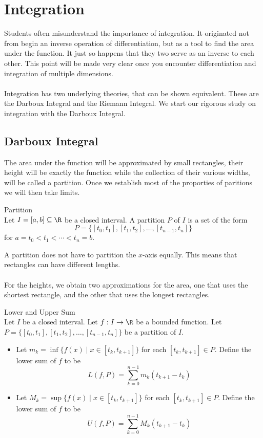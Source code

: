 \documentclass[a4paper]{article}
\begin{document}
\pagebreak
\section{Integration}
Students often misunderstand the importance of integration. It originated not from begin an inverse operation of differentiation, but as a tool to find the area under the function. It just so happens that they two serve as an inverse to each other. This point will be made very clear once you encounter differentiation and integration of multiple dimensions. \\~\\
Integration has two underlying theories, that can be shown equivalent. These are the Darboux Integral and the Riemann Integral. We start our rigorous study on integration with the Darboux Integral. 

\subsection{Darboux Integral}
The area under the function will be approximated by small rectangles, their height will be exactly the function while the collection of their various widths, will be called a partition. Once we establish most of the proporties of paritions we will then take limits. 

\begin{defn}{Partition}{}\\
Let $I=[a,b]\subseteq\R$ be a closed interval. A partition $P$ of $I$ is a set of the form $$P=\{[t_0,t_1],[t_1,t_2],\dots,[t_{n-1},t_n]\}$$ for $a=t_0<t_1<\cdots<t_n=b$. 
\end{defn}

A partition does not have to partition the $x$-axis equally. This means that rectangles can have different lengths. \\~\\
For the heights, we obtain two approximations for the area, one that uses the shortest rectangle, and the other that uses the longest rectangles. 

\begin{defn}{Lower and Upper Sum}{}\\
Let $I$ be a closed interval. Let $f:I\to\R$ be a bounded function. Let $P=\{[t_0,t_1],[t_1,t_2],\dots,[t_{n-1},t_n]\}$ be a partition of $I$. 
\begin{itemize}
\item Let $m_k=\inf\{f(x)\;|\;x\in[t_k,t_{k+1}]\}$ for each $[t_k,t_{k+1}]\in P$. Define the lower sum of $f$ to be $$L(f,P)=\sum_{k=0}^{n-1}m_k(t_{k+1}-t_k)$$
\item Let $M_k=\sup\{f(x)\;|\;x\in[t_k,t_{k+1}]\}$ for each $[t_k,t_{k+1}]\in P$. Define the lower sum of $f$ to be $$U(f,P)=\sum_{k=0}^{n-1}M_k(t_{k+1}-t_k)$$
\end{itemize}
\end{defn}
\end{document}
